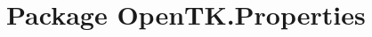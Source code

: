 \hypertarget{namespace_open_t_k_1_1_properties}{\section{Package Open\-T\-K.\-Properties}
\label{namespace_open_t_k_1_1_properties}
}
